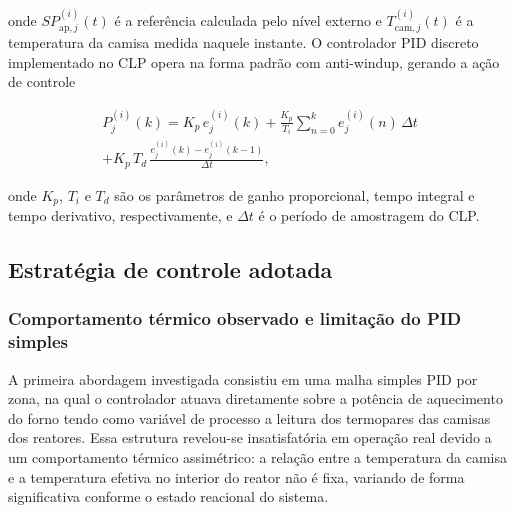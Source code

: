 onde $SP^{(i)}_{\mathrm{ap},j}(t)$ é a referência calculada pelo nível externo
e $T^{(i)}_{\mathrm{cam},j}(t)$ é a temperatura da camisa medida naquele instante.
O controlador PID discreto implementado no CLP opera na forma padrão com
anti-windup, gerando a ação de controle

\begin{multline}
  P^{(i)}_j(k) = K_p\,e^{(i)}_j(k)
    + \frac{K_p}{T_i}\sum_{n=0}^{k}e^{(i)}_j(n)\,\Delta t \\
    + K_p\,T_d\,\frac{e^{(i)}_j(k)-e^{(i)}_j(k-1)}{\Delta t},
  \label{eq:pid_discreto}
\end{multline}

onde $K_p$, $T_i$ e $T_d$ são os parâmetros de ganho proporcional, tempo
integral e tempo derivativo, respectivamente, e $\Delta t$ é o período de
amostragem do CLP.


\subsection{Estratégia de controle adotada}
\label{sec:estrategia}

\subsubsection{Comportamento térmico observado e limitação do PID simples}

A primeira abordagem investigada consistiu em uma malha simples PID por zona,
na qual o controlador atuava diretamente sobre a potência de aquecimento do
forno tendo como variável de processo a leitura dos termopares das camisas
dos reatores. Essa estrutura revelou-se insatisfatória em operação real
devido a um comportamento térmico assimétrico: a relação entre a temperatura
da camisa e a temperatura efetiva no interior do reator não é fixa, variando
de forma significativa conforme o estado reacional do sistema.\citep{luyben2014}

